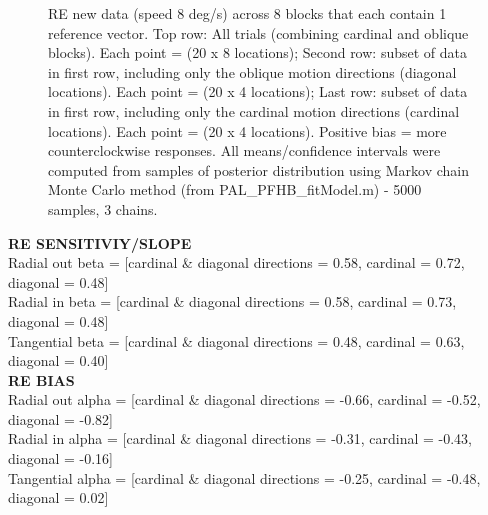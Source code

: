 \documentclass[11pt]{article} %
\begin{document}
\begin{figure}[H]
\caption{RE new data (speed 8 deg/s) across 8 blocks that each contain 1 reference vector. Top row: All trials (combining cardinal and oblique blocks). Each point = (20 x 8 locations); Second row: subset of data in first row, including only the oblique motion directions (diagonal locations). Each point = (20 x 4 locations); Last row: subset of data in first row, including only the cardinal motion directions (cardinal locations). Each point = (20 x 4 locations). Positive bias = more counterclockwise responses. All means/confidence intervals were computed from samples of posterior distribution using Markov chain Monte Carlo method (from PAL\_PFHB\_fitModel.m) - 5000 samples, 3 chains.}
\end{figure}

\textbf{RE SENSITIVIY/SLOPE}
\\
Radial out beta = [cardinal \& diagonal directions =  0.58, cardinal = 0.72, diagonal = 0.48]
\\
Radial in beta = [cardinal \& diagonal directions =  0.58, cardinal = 0.73, diagonal = 0.48]
\\
Tangential beta = [cardinal \& diagonal directions =  0.48, cardinal = 0.63, diagonal = 0.40]
\\
\textbf{RE BIAS}
\\
Radial out alpha = [cardinal \& diagonal directions =  -0.66, cardinal = -0.52, diagonal = -0.82]
\\
Radial in alpha = [cardinal \& diagonal directions =  -0.31, cardinal = -0.43, diagonal = -0.16]
\\
Tangential alpha = [cardinal \& diagonal directions =  -0.25, cardinal = -0.48, diagonal = 0.02]

\newpage
\end{document}
